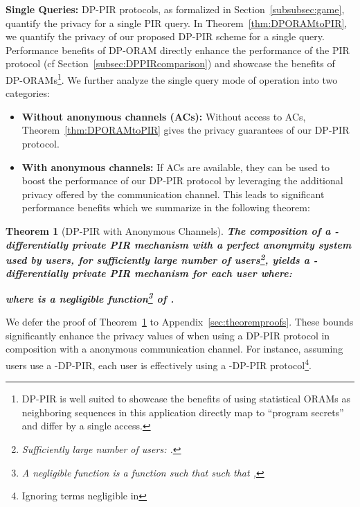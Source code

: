 \documentclass[USenglish,oneside,twocolumn]{article}
\newtheorem{theorem}{Theorem}
\begin{document}
\textbf{Single Queries: }DP-PIR protocols, as formalized in Section~\ref{subsubsec:game}, quantify the privacy for a single PIR query. In Theorem~\ref{thm:DPORAMtoPIR}, we quantify the privacy of our proposed DP-PIR scheme for a single query.
Performance benefits of DP-ORAM directly enhance the performance of the PIR protocol (cf Section~\ref{subsec:DPPIRcomparison}) and showcase the benefits of DP-ORAMs\footnote{DP-PIR is well suited to showcase the benefits of using statistical ORAMs as neighboring sequences in this application directly map to ``program secrets'' and differ by a single access.}.
We further analyze the single query mode of operation into two categories:
\begin{itemize}[noitemsep, topsep=1pt]
\itemsep0em 
\item \textbf{Without anonymous channels (ACs): }Without access to ACs, Theorem~\ref{thm:DPORAMtoPIR} gives the privacy guarantees of our DP-PIR protocol.
\item \textbf{With anonymous channels: }If ACs are available, they can be used to boost the performance of our DP-PIR protocol by leveraging the additional privacy offered by the communication channel. This leads to significant performance benefits which we summarize in the following theorem:
\end{itemize}
\begin{theorem}[DP-PIR with Anonymous Channels]\label{thm:DPPIRAnonymousChannels}
\textbf{The composition of a -differentially private PIR mechanism with a perfect anonymity system used by  users, for sufficiently large number of users\footnote{Sufficiently large number of users: .}, yields a -differentially private PIR mechanism for each user where:}

\textbf{where  is a negligible function\footnote{A negligible function  is a function  such that  such that ,
} of .}
\end{theorem}
We defer the proof of Theorem~\ref{thm:DPPIRAnonymousChannels} to Appendix~\ref{sec:theoremproofs}. 
These bounds significantly enhance the privacy values of when using a DP-PIR protocol in composition with a anonymous communication channel. For instance, assuming  users use a -DP-PIR, each user is effectively using a -DP-PIR protocol\footnote{Ignoring terms negligible in }.
\end{document}
